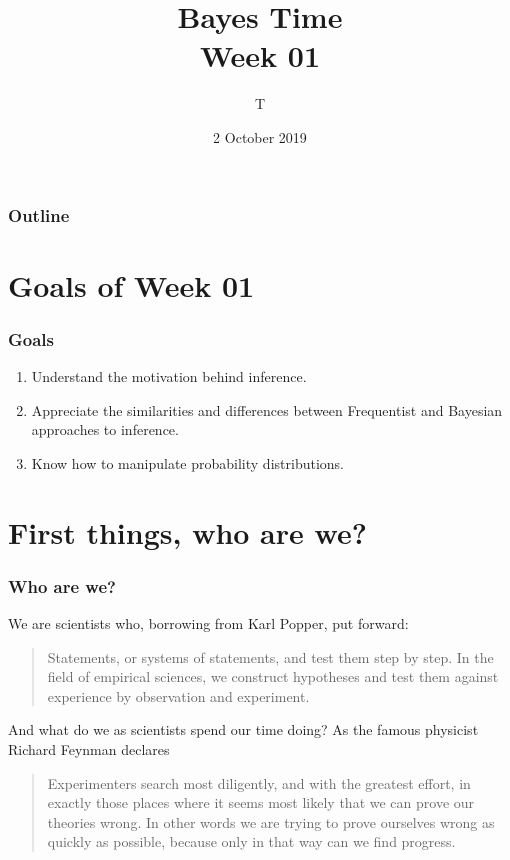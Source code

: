 \documentclass{beamer}
\begin{document}
\title{Bayes Time \\ \vspace{0.1in} Week 01}

\author{T}
\date{2 October 2019}

\begin{frame}
	\vspace{-0.75in}

	\titlepage	
\end{frame}


\begin{frame}
	\frametitle{Outline}
	\tableofcontents
\end{frame}


\section{Goals of Week 01}

\begin{frame}
\frametitle{Goals}

\begin{enumerate}
\item
  Understand the motivation behind inference.
\item
  Appreciate the similarities and differences between Frequentist and
  Bayesian approaches to inference.
\item
  Know how to manipulate probability distributions.
\end{enumerate}

\end{frame}


\section{First things, who are we?}

\begin{frame}
\frametitle{Who are we?}

We are scientists who, borrowing from Karl Popper, put forward:
\begin{quote} 
Statements, or systems of statements, and test them step by step. In the field of empirical sciences, we construct hypotheses and test them against experience by observation and experiment.
\end{quote}

\bigskip

And what do we as scientists spend our time doing? As the famous physicist Richard Feynman declares 
\begin{quote} 
Experimenters search most diligently, and with the greatest effort, in exactly those places where it seems most likely that we can prove our theories wrong. In other words we are trying to prove ourselves wrong as quickly as possible, because only in that way can we find progress.
\end{quote}

\end{frame}
\end{document}

